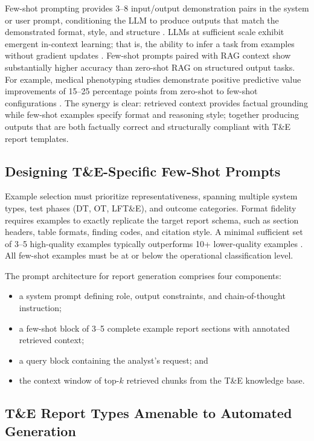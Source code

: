\documentclass[12pt,letterpaper]{article}
\let\cite\parencite
\begin{document}
Few-shot prompting provides 3--8 input/output demonstration pairs in the system or user prompt, conditioning the LLM to produce outputs that match the demonstrated format, style, and structure \cite{brown2020,promptingguide2024}. LLMs at sufficient scale exhibit emergent in-context learning; that is, the ability to infer a task from examples without gradient updates \cite{touvron2023}. Few-shot prompts paired with RAG context show substantially higher accuracy than zero-shot RAG on structured output tasks. For example, medical phenotyping studies demonstrate positive predictive value improvements of 15--25 percentage points from zero-shot to few-shot configurations \cite{medrxiv2025}. The synergy is clear: retrieved context provides factual grounding while few-shot examples specify format and reasoning style; together producing outputs that are both factually correct and structurally compliant with T\&E report templates.

\subsection{Designing T\&E-Specific Few-Shot Prompts}

Example selection must prioritize representativeness, spanning multiple system types, test phases (DT, OT, LFT\&E), and outcome categories. Format fidelity requires examples to exactly replicate the target report schema, such as section headers, table formats, finding codes, and citation style. A minimal sufficient set of 3--5 high-quality examples typically outperforms 10+ lower-quality examples \cite{ares2024,liu2022}. All few-shot examples must be at or below the operational classification level.

The prompt architecture for report generation comprises four components:
\begin{itemize}
\item a system prompt defining role, output constraints, and chain-of-thought instruction;
\item a few-shot block of 3--5 complete example report sections with annotated retrieved context;
\item a query block containing the analyst's request; and
\item the context window of top-$k$ retrieved chunks from the T\&E knowledge base.
\end{itemize}

\subsection{T\&E Report Types Amenable to Automated Generation}
\end{document}
